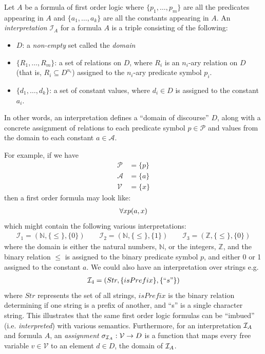 \documentclass[10pt]{article}
\begin{document}
Let $A$ be a formula of first order logic where $\{p_1,\dots,p_m\}$ are all the predicates appearing in $A$ and $\{a_1,\dots,a_k\}$ are all the constants appearing in $A$. An \textit{interpretation} $\mathcal{I}_A$ for a formula $A$ is a triple consisting of the following: 
\begin{itemize}
    \item $D$: a \textit{non-empty} set called the \textit{domain}
    \item $\{R_1,\dots, R_m\}$: a set of relations on $D$, where $R_i$ is an $n_i$-ary relation on $D$ (that is, $R_i \subseteq D^{n_i}$) assigned to the $n_i$-ary predicate symbol $p_i$.
    \item $\{d_1,\dots,d_k\}$: a set of constant values, where $d_i \in D$ is assigned to the constant $a_i$.
\end{itemize}
In other words, an interpretation defines a ``domain of discourse'' $D$, along with a concrete assignment of relations to each predicate symbol $p \in \mathcal{P}$ and values from the domain to each constant $a \in \mathcal{A}$. 

For example, if we have
\begin{align*}
    \mathcal{P} &= \{p\}\\
    \mathcal{A} &= \{a\}\\
    \mathcal{V} &= \{x\}
\end{align*}
then a first order formula may look like:
\begin{align*}
    \forall x p(a,x)
\end{align*}
which might contain the following various interpretations:
\begin{align*}
    \mathcal{I}_1 = (\mathbb{N},\{\leq\},\{0\})\qquad 
    \mathcal{I}_2 = (\mathbb{N},\{\leq\},\{1\})\qquad
    \mathcal{I}_3 = (\mathbb{Z},\{\leq\},\{0\})
\end{align*}
where the domain is either the natural numbers, $\mathbb{N}$, or the integers, $\mathbb{Z}$, and the binary relation $\leq$ is assigned to the binary predicate symbol $p$, and either 0 or 1 assigned to the constant $a$. We could also have an interpretation over strings e.g.
\begin{align*}
    \mathcal{I}_4 = (Str, \{isPrefix\}, \{``s"\})
\end{align*}
where $Str$ represents the set of all strings, $isPrefix$ is the binary relation determining if one string is a prefix of another, and ``s'' is a single character string. This illustrates that the same first order logic formulas can be ``imbued'' (i.e. \textit{interpreted}) with various semantics. Furthermore, for an interpretation $\mathcal{I}_A$ and formula $A$, an \textit{assignment} $\sigma_{\mathcal{I}_A} : \mathcal{V} \rightarrow D$ is a function that maps every free variable $v \in \mathcal{V}$ to an element $d \in D$, the domain of $\mathcal{I}_A$.
\end{document}
